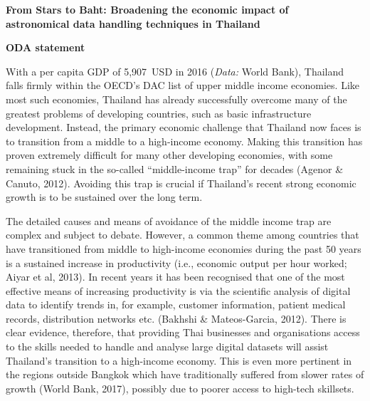 \documentclass[11pt]{article}
\begin{document}
  \setcounter{figure}{0}
  \noindent
  {\LARGE \bf From Stars to Baht: Broadening the economic impact of \\
  astronomical data handling techniques in Thailand}
  
  \vspace{3mm}
  \noindent
  {\Large \bf ODA statement}
  
  \vspace{2mm}
  \noindent
  With a per capita GDP of 5,907~USD in 2016 ({\it Data:} World Bank), Thailand falls firmly within the OECD's DAC list of upper middle income economies. Like most such economies, Thailand has already successfully overcome many of the greatest problems of developing countries, such as basic infrastructure development. Instead, the primary economic challenge that Thailand now faces is to transition from a middle to a high-income economy. Making this transition has proven extremely difficult for many other developing economies, with some remaining stuck in the so-called ``middle-income trap'' for decades (Agenor \& Canuto, 2012). Avoiding this trap is crucial if Thailand's recent strong economic growth is to be sustained over the long term.     
  
  \vspace{2mm}
  \noindent
  The detailed causes and means of avoidance of the middle income trap are complex and subject to debate. However, a common theme among countries that have transitioned from middle to high-income economies during the past 50 years is a sustained increase in productivity (i.e., economic output per hour worked; Aiyar et al, 2013). In recent years it has been recognised that one of the most effective means of increasing productivity is via the scientific analysis of digital data to identify trends in, for example, customer information, patient medical records, distribution networks etc. (Bakhshi \& Mateos-Garcia, 2012). There is clear evidence, therefore, that providing Thai businesses and organisations access to the skills needed to handle and analyse large digital datasets will assist Thailand's transition to a high-income economy. This is even more pertinent in the regions outside Bangkok which have traditionally suffered from slower rates of growth (World Bank, 2017), possibly due to poorer access to high-tech skillsets.    
  
\end{document}
